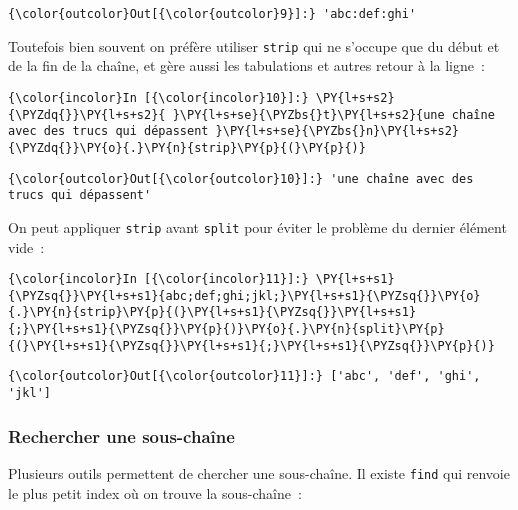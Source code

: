 \begin{Verbatim}[commandchars=\\\{\}]
{\color{outcolor}Out[{\color{outcolor}9}]:} 'abc:def:ghi'
\end{Verbatim}
            
    Toutefois bien souvent on préfère utiliser \texttt{strip} qui ne
s'occupe que du début et de la fin de la chaîne, et gère aussi les
tabulations et autres retour à la ligne~:

    \begin{Verbatim}[commandchars=\\\{\}]
{\color{incolor}In [{\color{incolor}10}]:} \PY{l+s+s2}{\PYZdq{}}\PY{l+s+s2}{ }\PY{l+s+se}{\PYZbs{}t}\PY{l+s+s2}{une chaîne avec des trucs qui dépassent }\PY{l+s+se}{\PYZbs{}n}\PY{l+s+s2}{\PYZdq{}}\PY{o}{.}\PY{n}{strip}\PY{p}{(}\PY{p}{)}
\end{Verbatim}


\begin{Verbatim}[commandchars=\\\{\}]
{\color{outcolor}Out[{\color{outcolor}10}]:} 'une chaîne avec des trucs qui dépassent'
\end{Verbatim}
            
    On peut appliquer \texttt{strip} avant \texttt{split} pour éviter le
problème du dernier élément vide~:

    \begin{Verbatim}[commandchars=\\\{\}]
{\color{incolor}In [{\color{incolor}11}]:} \PY{l+s+s1}{\PYZsq{}}\PY{l+s+s1}{abc;def;ghi;jkl;}\PY{l+s+s1}{\PYZsq{}}\PY{o}{.}\PY{n}{strip}\PY{p}{(}\PY{l+s+s1}{\PYZsq{}}\PY{l+s+s1}{;}\PY{l+s+s1}{\PYZsq{}}\PY{p}{)}\PY{o}{.}\PY{n}{split}\PY{p}{(}\PY{l+s+s1}{\PYZsq{}}\PY{l+s+s1}{;}\PY{l+s+s1}{\PYZsq{}}\PY{p}{)}
\end{Verbatim}


\begin{Verbatim}[commandchars=\\\{\}]
{\color{outcolor}Out[{\color{outcolor}11}]:} ['abc', 'def', 'ghi', 'jkl']
\end{Verbatim}
            
    \hypertarget{rechercher-une-sous-chauxeene}{%
\subsubsection{Rechercher une
sous-chaîne}\label{rechercher-une-sous-chauxeene}}

    Plusieurs outils permettent de chercher une sous-chaîne. Il existe
\texttt{find} qui renvoie le plus petit index où on trouve la
sous-chaîne~:

